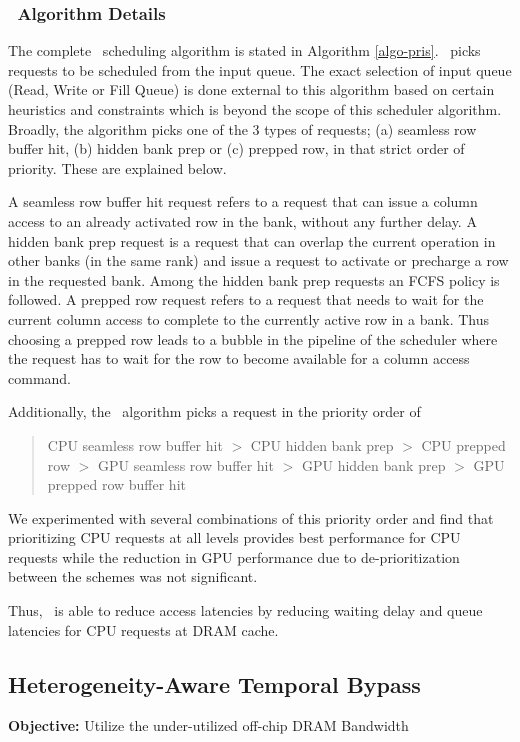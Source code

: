 \subsubsection{\prioname\ Algorithm Details}
\par The complete \prioname\ scheduling algorithm is stated in Algorithm \ref{algo-pris}. \prioname\ picks requests to be scheduled from the input queue. The exact selection of input queue (Read, Write or Fill Queue) is done external to this algorithm based on certain heuristics and constraints which is beyond the scope of this scheduler algorithm. Broadly, the algorithm picks one of the 3 types of requests; (a) seamless row buffer hit, (b) hidden bank prep or (c) prepped row, in that strict order of priority. These are explained below.
\par A seamless row buffer hit request refers to a request that can issue a column access to an already activated row in the bank, without any further delay. A hidden bank prep request is a request that can overlap the current operation in other banks (in the same rank) and issue a request to activate or precharge a row in the requested bank. Among the hidden bank prep requests an FCFS policy is followed. A prepped row request refers to a request that needs to wait for the current column access to complete to the currently active row in a bank. Thus choosing a prepped row leads to a bubble in the pipeline of the scheduler where the request has to wait for the row to become available for a column access command.

\par Additionally, the \prioname\ algorithm picks a request in the priority order of
\begin{quote}
CPU seamless row buffer hit $>$ CPU hidden bank prep $>$ CPU prepped row $>$ GPU seamless row buffer hit $>$ GPU hidden bank prep $>$ GPU prepped row buffer hit
\end{quote}
We experimented with several combinations of this priority order and find that prioritizing CPU requests at all levels provides best performance for CPU requests while the reduction in GPU performance due to de-prioritization between the schemes was not significant.
\par Thus, \prioname\ is able to reduce access latencies by reducing waiting delay and queue latencies for CPU requests at DRAM cache.



\subsection{Heterogeneity-Aware Temporal Bypass} \label{mechanism-bye}
\textbf{Objective:} Utilize the under-utilized off-chip DRAM Bandwidth
